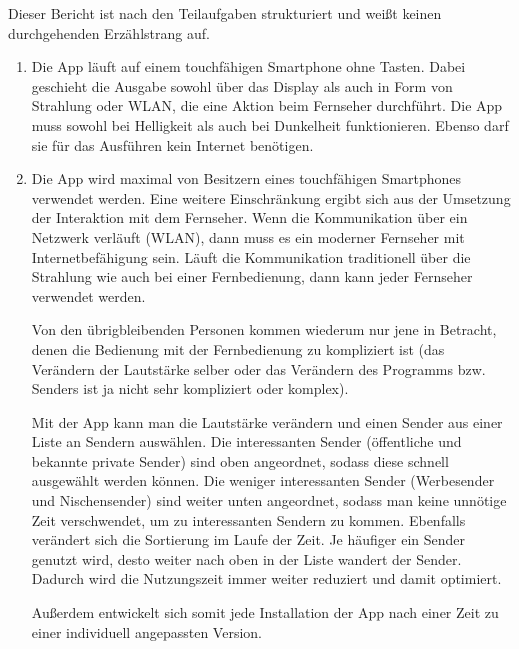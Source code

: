 \documentclass[a4paper,10pt]{scrartcl}
\begin{document}
\kopf
\renewcommand{\figurename}{Figure}


Dieser Bericht ist nach den Teilaufgaben strukturiert und weißt keinen durchgehenden Erzählstrang auf.
	\begin{enumerate}
		\item 
		Die App läuft auf einem touchfähigen Smartphone ohne Tasten. Dabei geschieht die Ausgabe sowohl über das Display als auch in Form von Strahlung oder WLAN, die eine Aktion beim Fernseher durchführt. Die App muss sowohl bei Helligkeit als auch bei Dunkelheit funktionieren. Ebenso darf sie für das Ausführen kein Internet benötigen.
		\item 
		Die App wird maximal von Besitzern eines touchfähigen Smartphones verwendet werden. Eine weitere Einschränkung ergibt sich aus der Umsetzung der Interaktion mit dem Fernseher. Wenn die Kommunikation über ein Netzwerk verläuft (WLAN), dann muss es ein moderner Fernseher mit Internetbefähigung sein. Läuft die Kommunikation traditionell über die Strahlung wie auch bei einer Fernbedienung, dann kann jeder Fernseher verwendet werden.
		
		Von den übrigbleibenden Personen kommen wiederum nur jene in Betracht, denen die Bedienung mit der Fernbedienung zu kompliziert ist (das Verändern der Lautstärke selber oder das Verändern des Programms bzw. Senders ist ja nicht sehr kompliziert oder komplex).
		
		Mit der App kann man die Lautstärke verändern und einen Sender aus einer Liste an Sendern auswählen. Die interessanten Sender (öffentliche und bekannte private Sender) sind oben angeordnet, sodass diese schnell ausgewählt werden können. Die weniger interessanten Sender (Werbesender und Nischensender) sind weiter unten angeordnet, sodass man keine unnötige Zeit verschwendet, um zu interessanten Sendern zu kommen. Ebenfalls verändert sich die Sortierung im Laufe der Zeit. Je häufiger ein Sender genutzt wird, desto weiter nach oben in der Liste wandert der Sender. Dadurch wird die Nutzungszeit immer weiter reduziert und damit optimiert.

		Außerdem entwickelt sich somit jede Installation der App nach einer Zeit zu einer individuell angepassten Version.
		

\end{enumerate}
\end{document}
